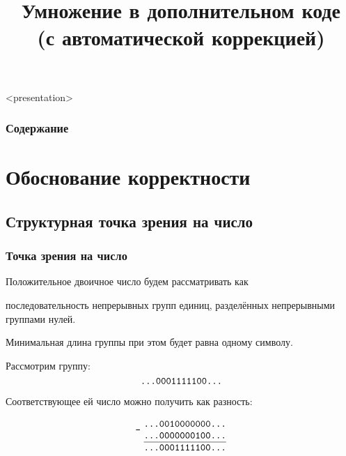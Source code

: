


\title[Умножение в ДК (АК)]{Умножение в дополнительном коде\\(с автоматической коррекцией)}

\setcounter{TaskSimpleCtr}{1}
\newcommand{\TaskSimpleNumber}{ \arabic{TaskSimpleCtr}) \addtocounter{TaskSimpleCtr}{1} }




\begin{frame}<presentation>
    \frametitle{Содержание}
    \tableofcontents
\end{frame}


\section{Обоснование корректности}


\subsection{Структурная точка зрения на число}


\begin{frame}
    \frametitle{Точка зрения на число}

    Положительное двоичное число будем рассматривать как 
    \begin{block}{}
        последовательность непрерывных групп единиц, разделённых непрерывными группами нулей. 
    \end{block}
    
    Минимальная длина группы при этом будет равна одному символу.

    \begin{block}{}
        Рассмотрим группу:
        \[
            \texttt{...0001111100...}
        \]
    \end{block}
    
    Соответствующее ей число можно получить как разность:
    
    \begin{block}{}
        \[
            \Subtraction{...0010000000...}
                        {...0000000100...}
                        {...0001111100...}
        \]
    \end{block}
\end{frame}

